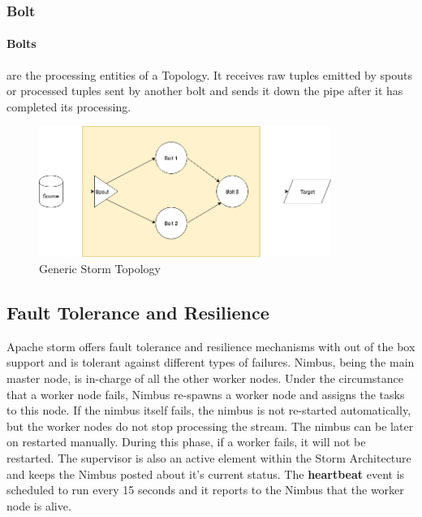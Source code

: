 \documentclass[runningheads,a4paper]{llncs}[2015/06/24]
\begin{document}
\subsubsection{Bolt} 
\paragraph{Bolts} are the processing entities of a Topology. It receives raw tuples emitted by spouts or processed tuples sent by another bolt and sends it down the pipe after it has completed its processing.

\begin{figure}
  \begin{center}
    \includegraphics[width=0.85\textwidth, height= 0.23\textheight]{topo.png}
    \caption{Generic Storm Topology}
    \label{fig:topo}
   \end{center}
\end{figure}

\subsection{Fault Tolerance and Resilience}
\label{sec:resilience}
Apache storm offers fault tolerance and resilience mechanisms with out of the box support and is tolerant against different types of failures. Nimbus, being the main master node, is in-charge of all the other worker nodes. Under the circumstance that a worker node fails, Nimbus re-spawns a worker node and assigns the tasks to this node. If the nimbus itself fails, the nimbus is not re-started automatically, but the worker nodes do not stop processing the stream. The nimbus can be later on restarted manually. During this phase, if a worker fails, it will not be restarted. The supervisor is also an active element within the Storm Architecture and keeps the Nimbus posted about it's current status. The \textbf{heartbeat} event is scheduled to run every 15 seconds and it reports to the Nimbus that the worker node is alive. \cite{stormtwitter}
\end{document}
